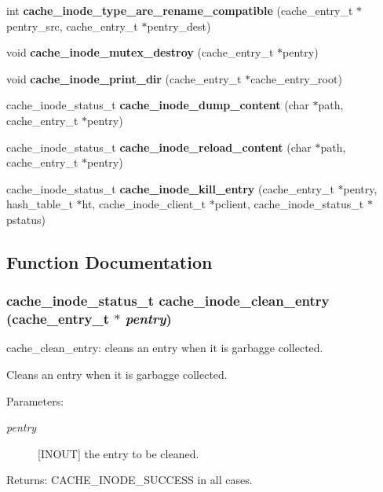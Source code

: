 \begin{CompactItemize}
int {\bf cache\_\-inode\_\-type\_\-are\_\-rename\_\-compatible} (cache\_\-entry\_\-t $\ast$pentry\_\-src, cache\_\-entry\_\-t $\ast$pentry\_\-dest)
\item 
void {\bf cache\_\-inode\_\-mutex\_\-destroy} (cache\_\-entry\_\-t $\ast$pentry)
\item 
void {\bf cache\_\-inode\_\-print\_\-dir} (cache\_\-entry\_\-t $\ast$cache\_\-entry\_\-root)
\item 
cache\_\-inode\_\-status\_\-t {\bf cache\_\-inode\_\-dump\_\-content} (char $\ast$path, cache\_\-entry\_\-t $\ast$pentry)
\item 
cache\_\-inode\_\-status\_\-t {\bf cache\_\-inode\_\-reload\_\-content} (char $\ast$path, cache\_\-entry\_\-t $\ast$pentry)
\item 
cache\_\-inode\_\-status\_\-t {\bf cache\_\-inode\_\-kill\_\-entry} (cache\_\-entry\_\-t $\ast$pentry, hash\_\-table\_\-t $\ast$ht, cache\_\-inode\_\-client\_\-t $\ast$pclient, cache\_\-inode\_\-status\_\-t $\ast$pstatus)
\end{CompactItemize}


\subsection{Function Documentation}
\subsubsection[{cache\_\-inode\_\-clean\_\-entry}]{\setlength{\rightskip}{0pt plus 5cm}cache\_\-inode\_\-status\_\-t cache\_\-inode\_\-clean\_\-entry (cache\_\-entry\_\-t $\ast$ {\em pentry})}\label{cache__inode__misc_8c_efe5de533cbaea1af0370e4393c74c4c}


cache\_\-clean\_\-entry: cleans an entry when it is garbagge collected.

Cleans an entry when it is garbagge collected.

\begin{Desc}
\item[Parameters:]
\begin{description}
\item[{\em pentry}][INOUT] the entry to be cleaned.\end{description}
\end{Desc}
\begin{Desc}
\item[Returns:]CACHE\_\-INODE\_\-SUCCESS in all cases. \end{Desc}


